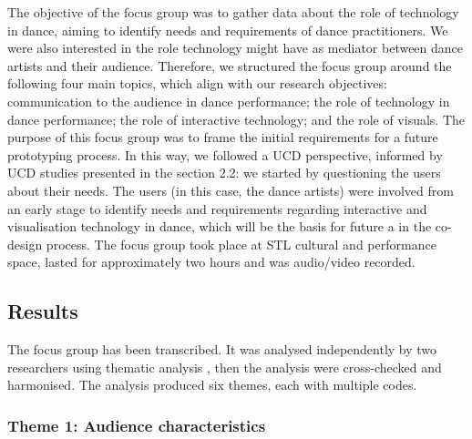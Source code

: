 The objective of the focus group was to gather data about the role of technology in dance, aiming to identify needs and requirements of dance practitioners. We were also interested in the role technology might have as mediator between dance artists and their audience. Therefore, we structured the focus group around the following four main topics, which align with our research objectives: communication to the audience in dance performance; the role of technology in dance performance; the role of interactive technology; and the role of visuals. The purpose of this focus group was to frame the initial requirements for a future prototyping process. In this way, we followed a UCD perspective, informed by UCD studies presented in the section 2.2: we started by questioning the users about their needs. 
The users (in this case, the dance artists) were involved from an early stage to identify needs and requirements regarding interactive and visualisation technology in dance, which will be the basis for future a in the co-design process. The focus group took place at STL cultural and performance space, lasted for approximately two hours and was audio/video recorded. 

\subsection{Results}

The focus group has been transcribed. It was analysed independently by two researchers using thematic analysis \cite{braun2006using}, then the analysis were cross-checked and harmonised. The analysis produced six themes, each with multiple codes.

\subsubsection{Theme 1: Audience characteristics}


